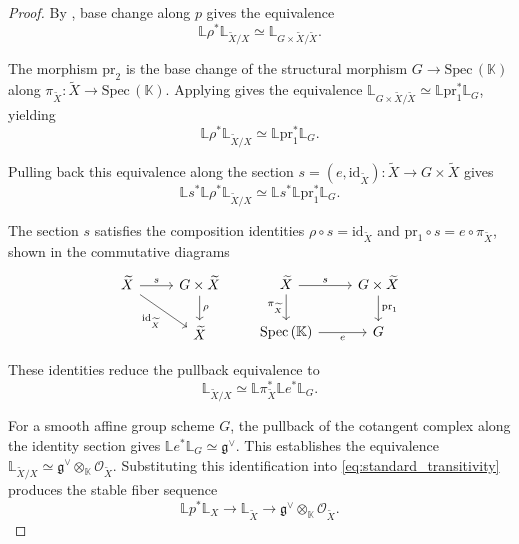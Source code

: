 \documentclass[reqno]{amsart}
\theoremstyle{definition}
\theoremstyle{remark}
\newcommand{\LL}{\mathbb{L}}
\newcommand{\cO}{\mathcal{O}}
\newcommand{\K}{\mathbb{K}}
\newcommand{\Spec}{\mathrm{Spec\,}}
\begin{document}
{\begin{proof}
  By \cite[Lemma 1.4.1.16(2)]{HAG-II}, base change along $p$ gives the equivalence
  \begin{equation*}
    \mathbb{L}\rho^* \LL_{\widetilde{X}/X} \simeq \LL_{G \times \widetilde{X} / \widetilde{X}}.
  \end{equation*}
  
  The morphism $\mathrm{pr}_2$ is the base change of the structural morphism $G \to \Spec(\K)$ along $\pi_{\widetilde{X}} \colon \widetilde{X} \to \Spec(\K)$. Applying \cite[Lemma 1.4.1.16(2)]{HAG-II} gives the equivalence $\LL_{G \times \widetilde{X} / \widetilde{X}} \simeq \mathbb{L}\mathrm{pr}_1^* \LL_{G}$, yielding
  \begin{equation*}
    \mathbb{L}\rho^* \LL_{\widetilde{X}/X} \simeq \mathbb{L}\mathrm{pr}_1^* \LL_{G}.
  \end{equation*}
  
  Pulling back this equivalence along the section $s = (e, \mathrm{id}_{\widetilde{X}}) \colon \widetilde{X} \to G \times \widetilde{X}$ gives
  \begin{equation*}
    \mathbb{L}s^* \mathbb{L}\rho^* \LL_{\widetilde{X}/X} \simeq \mathbb{L}s^* \mathbb{L}\mathrm{pr}_1^* \LL_{G}.
  \end{equation*}
  
  The section $s$ satisfies the composition identities $\rho \circ s = \mathrm{id}_{\widetilde{X}}$ and $\mathrm{pr}_1 \circ s = e \circ \pi_{\widetilde{X}}$, shown in the commutative diagrams
  \[
    \begin{tikzcd}
        \widetilde{X} \arrow[r, "s"] \arrow[dr, "\mathrm{id}_{\widetilde{X}}"'] & G \times \widetilde{X} \arrow[d, "\rho"] \\
         & \widetilde{X}
    \end{tikzcd}
    \quad \quad
    \begin{tikzcd}
        \widetilde{X} \arrow[r, "s"] \arrow[d, "\pi_{\widetilde{X}}"'] & G \times \widetilde{X} \arrow[d, "\mathrm{pr}_1"] \\
        \Spec(\K) \arrow[r, "e"'] & G
    \end{tikzcd}
  \]
  
  These identities reduce the pullback equivalence to
  \begin{equation*}
    \LL_{\widetilde{X}/X} \simeq \mathbb{L}\pi_{\widetilde{X}}^* \mathbb{L}e^* \LL_{G}.
  \end{equation*}
  
  For a smooth affine group scheme $G$, the pullback of the cotangent complex along the identity section gives $\mathbb{L}e^* \LL_{G} \simeq \mathfrak{g}^\vee$. This establishes the equivalence $\LL_{\widetilde{X}/X} \simeq \mathfrak{g}^\vee \otimes_{\mathbb{K}} \cO_{\widetilde{X}}$. Substituting this identification into \eqref{eq:standard_transitivity} produces the stable fiber sequence $$\mathbb{L}p^*\LL_{X} \to \LL_{\widetilde{X}} \to \mathfrak{g}^\vee \otimes_{\mathbb{K}} \cO_{\widetilde{X}}.$$
    \end{proof}

}
\end{document}
